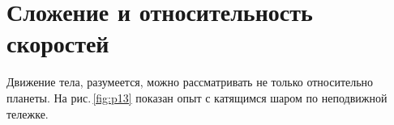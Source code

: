 \documentclass[main.tex]{subfiles}
\begin{document}


\pagestyle{empty}

 

\setcounter{section}{7
}
\addtocounter{section}{-1} 

\section{Сложение и относительность скоростей}


Движение тела, разумеется, можно рассматривать не только относительно планеты. На рис.\,\ref{fig:p13} показан опыт с катящимся шаром по неподвижной тележке.
\end{document}
